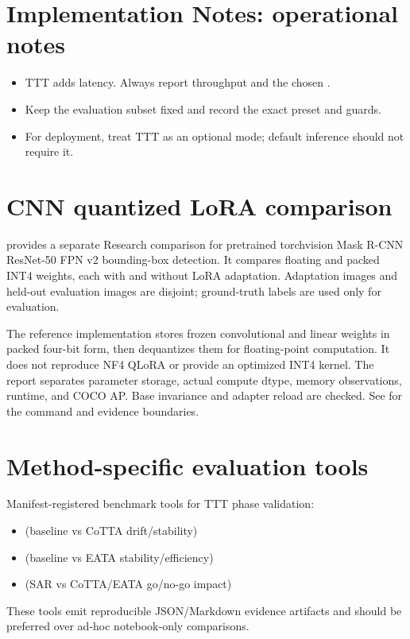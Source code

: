 \section{Implementation Notes: operational notes}
\begin{itemize}
  \item TTT adds latency. Always report throughput and the chosen .
  \item Keep the evaluation subset fixed and record the exact preset and guards.
  \item For deployment, treat TTT as an optional mode; default inference should not require it.
\end{itemize}

\section{CNN quantized LoRA comparison}
 provides a separate Research comparison for
pretrained torchvision Mask R-CNN ResNet-50 FPN v2 bounding-box detection.
It compares floating and packed INT4 weights, each with and without LoRA
adaptation. Adaptation images and held-out evaluation images are disjoint;
ground-truth labels are used only for evaluation.

The reference implementation stores frozen convolutional and linear weights in
packed four-bit form, then dequantizes them for floating-point computation.
It does not reproduce NF4 QLoRA or provide an optimized INT4 kernel. The report
separates parameter storage, actual compute dtype, memory observations, runtime,
and COCO AP. Base invariance and adapter reload are checked. See
 for the command and evidence boundaries.

\section{Method-specific evaluation tools}
Manifest-registered benchmark tools for TTT phase validation:
\begin{itemize}
  \item {} (baseline vs CoTTA drift/stability)
  \item {} (baseline vs EATA stability/efficiency)
  \item {} (SAR vs CoTTA/EATA go/no-go impact)
\end{itemize}

These tools emit reproducible JSON/Markdown evidence artifacts and should be preferred over ad-hoc notebook-only comparisons.
